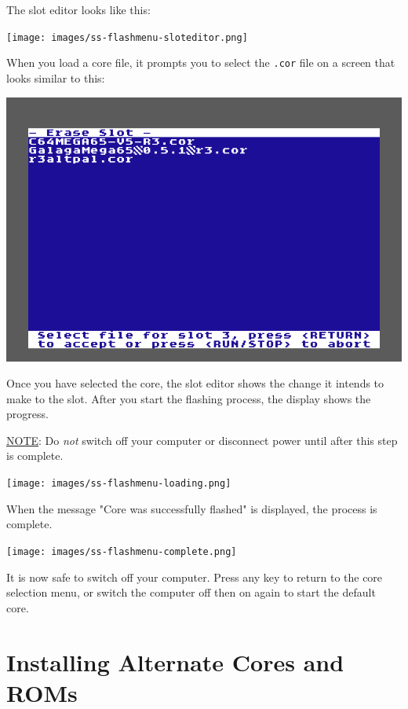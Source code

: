 The slot editor looks like this:

\begin{center}
  \texttt{[image: images/ss-flashmenu-sloteditor.png]}
\end{center}

When you load a core file, it prompts you to select the {\tt .cor} file on a screen that looks similar to this:

\begin{center}
  \includegraphics[width=0.7\linewidth]{images/ss-flashmenu-selectcore.png}
\end{center}

Once you have selected the core, the slot editor shows the change it intends to make to the slot. After you start the flashing process, the display shows the progress.

\underline{NOTE}: Do {\em not} switch off your computer or disconnect power until after this step is complete.

\begin{center}
  \texttt{[image: images/ss-flashmenu-loading.png]}
\end{center}

When the message "Core was successfully flashed" is displayed, the process is complete.

\begin{center}
  \texttt{[image: images/ss-flashmenu-complete.png]}
\end{center}

It is now safe to switch off your computer. Press any key to return to the core selection menu, or switch the computer off then on again to start the default core.


\section{Installing Alternate Cores and ROMs}

